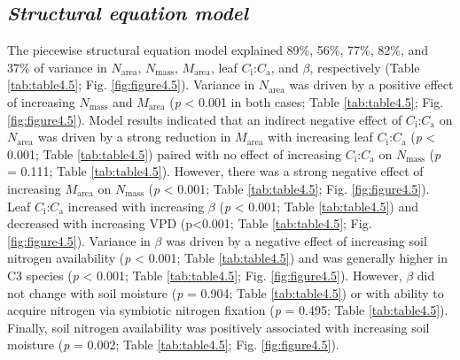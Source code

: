 \subsection{\textit{Structural equation model}}
\noindent The piecewise structural equation model explained 89\%, 56\%, 77\%, 82\%, and 37\% of variance in $N_\mathrm{area}$, $N_\mathrm{mass}$, $M_\mathrm{area}$, leaf $C_\mathrm{i}$:$C_\mathrm{a}$, and $\beta$, respectively (Table \ref{tab:table4.5}; Fig. \ref{fig:figure4.5}). Variance in $N_\mathrm{area}$ was driven by a positive effect of increasing $N_\mathrm{mass}$ and $M_\mathrm{area}$ (\textit{p} < 0.001 in both cases; Table \ref{tab:table4.5}; Fig. \ref{fig:figure4.5}). Model results indicated that an indirect negative effect of $C_\mathrm{i}$:$C_\mathrm{a}$ on $N_\mathrm{area}$ was driven by a strong reduction in $M_\mathrm{area}$ with increasing leaf $C_\mathrm{i}$:$C_\mathrm{a}$ (\textit{p} < 0.001; Table \ref{tab:table4.5}) paired with no effect of increasing $C_\mathrm{i}$:$C_\mathrm{a}$ on $N_\mathrm{mass}$ (\textit{p} = 0.111; Table \ref{tab:table4.5}). However, there was a strong negative effect of increasing $M_\mathrm{area}$ on $N_\mathrm{mass}$ (\textit{p} < 0.001; Table \ref{tab:table4.5}; Fig. \ref{fig:figure4.5}). Leaf $C_\mathrm{i}$:$C_\mathrm{a}$ increased with increasing $\beta$ (\textit{p} < 0.001; Table \ref{tab:table4.5}) and decreased with increasing VPD (p<0.001; Table \ref{tab:table4.5}; Fig. \ref{fig:figure4.5}). Variance in $\beta$ was driven by a negative effect of increasing soil nitrogen availability (\textit{p} < 0.001; Table \ref{tab:table4.5}) and was generally higher in C3 species (\textit{p} < 0.001; Table \ref{tab:table4.5}; Fig. \ref{fig:figure4.5}). However, $\beta$ did not change with soil moisture (\textit{p} = 0.904; Table \ref{tab:table4.5}) or with ability to acquire nitrogen via symbiotic nitrogen fixation (\textit{p} = 0.495; Table \ref{tab:table4.5}). Finally, soil nitrogen availability was positively associated with increasing soil moisture (\textit{p} = 0.002; Table \ref{tab:table4.5}; Fig. \ref{fig:figure4.5}).



